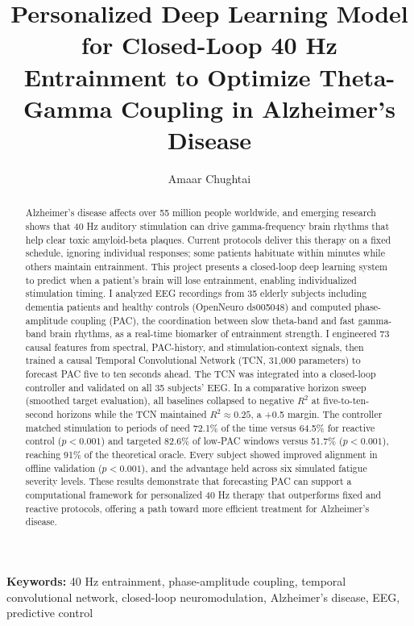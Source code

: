 \documentclass[11pt,letterpaper]{article}
\begin{document}
\title{Personalized Deep Learning Model for Closed-Loop 40 Hz Entrainment to Optimize Theta-Gamma Coupling in Alzheimer's Disease}

\author{Amaar Chughtai}
\date{}
\maketitle
\thispagestyle{plain}

\begin{abstract}
Alzheimer's disease affects over 55 million people worldwide, and emerging research shows that 40 Hz auditory stimulation can drive gamma-frequency brain rhythms that help clear toxic amyloid-beta plaques. Current protocols deliver this therapy on a fixed schedule, ignoring individual responses; some patients habituate within minutes while others maintain entrainment. This project presents a closed-loop deep learning system to predict when a patient's brain will lose entrainment, enabling individualized stimulation timing.
I analyzed EEG recordings from 35 elderly subjects including dementia patients and healthy controls (OpenNeuro ds005048) and computed phase-amplitude coupling (PAC), the coordination between slow theta-band and fast gamma-band brain rhythms, as a real-time biomarker of entrainment strength. I engineered 73 causal features from spectral, PAC-history, and stimulation-context signals, then trained a causal Temporal Convolutional Network (TCN, 31,000 parameters) to forecast PAC five to ten seconds ahead. The TCN was integrated into a closed-loop controller and validated on all 35 subjects' EEG.
In a comparative horizon sweep (smoothed target evaluation), all baselines collapsed to negative $R^2$ at five-to-ten-second horizons while the TCN maintained $R^2 \approx 0.25$, a +0.5 margin. The controller matched stimulation to periods of need 72.1\% of the time versus 64.5\% for reactive control ($p < 0.001$) and targeted 82.6\% of low-PAC windows versus 51.7\% ($p < 0.001$), reaching 91\% of the theoretical oracle. Every subject showed improved alignment in offline validation ($p < 0.001$), and the advantage held across six simulated fatigue severity levels.
These results demonstrate that forecasting PAC can support a computational framework for personalized 40 Hz therapy that outperforms fixed and reactive protocols, offering a path toward more efficient treatment for Alzheimer's disease.
\end{abstract}

\vspace{0.5em}
\noindent \textbf{Keywords:} 40 Hz entrainment, phase-amplitude coupling, temporal convolutional network, closed-loop neuromodulation, Alzheimer's disease, EEG, predictive control
\end{document}
